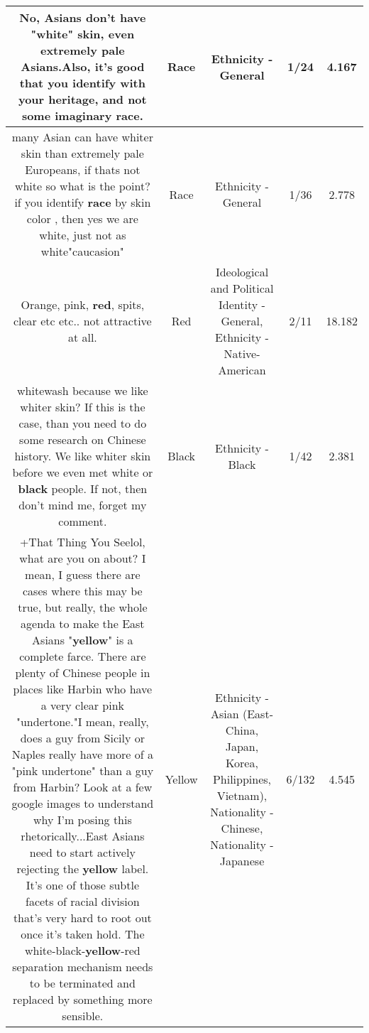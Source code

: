 \documentclass[11pt]{article}
\newlength\mylength
\begin{document}
\begin{center}
\begin{longtable}{|C{.65\mylength}|C{.30\mylength}|C{.12\mylength}|C{.12\mylength}|C{.12\mylength}|}
  \small No, Asians don't have "white" skin, even extremely pale Asians.Also, it's good that you identify with your heritage, and not some imaginary \textbf{race}.\normalsize   & Race & Ethnicity - General & 1/24 & 4.167 \\  \hline
  \small many Asian can have whiter skin than extremely pale Europeans, if thats not white so what is the point? if you identify \textbf{race} by skin color , then yes we are white, just not as white"caucasion"\normalsize   & Race & Ethnicity - General & 1/36 & 2.778 \\  \hline
  \small Orange, pink, \textbf{r\textbf{ed}}, spits, clear etc etc.. not attractive at all.\normalsize   & Red &  Ideological and Political Identity - General, Ethnicity - Native-American & 2/11 & 18.182 \\  \hline
  \small whitewash because we like whiter skin? If this is the case, than you need to do some research on Chinese history. We like whiter skin before we even met white or \textbf{black} people. If not, then don't mind me, forget my comment.\normalsize   & Black & Ethnicity - Black & 1/42 & 2.381 \\  \hline
  \small +That Thing You Seelol, what are you on about? I mean, I guess there are cases where this may be true, but really, the whole agenda to make the East Asians "\textbf{y\textbf{e\textbf{llow}}}" is a complete farce. There are plenty of Chinese people in places like Harbin who have a very clear pink "undertone."I mean, really, does a guy from Sicily or Naples really have more of a "pink undertone" than a guy from Harbin? Look at a few google images to understand why I'm posing this rhetorically...East Asians need to start actively rejecting the \textbf{y\textbf{e\textbf{llow}}} label. It's one of those subtle facets of racial division that's very hard to root out once it's taken hold. The white-black-\textbf{y\textbf{e\textbf{llow}}}-red separation mechanism needs to be terminated and replaced by something more sensible.\normalsize   & Yellow & Ethnicity - Asian (East- China, Japan, Korea, Philippines, Vietnam), Nationality - Chinese, Nationality - Japanese & 6/132 & 4.545 \\  \hline

\end{longtable}
\end{center}
\end{document}
